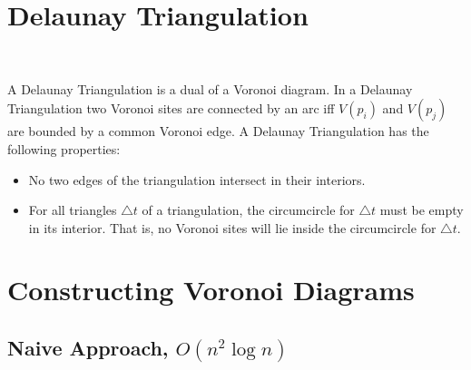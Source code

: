 \documentclass[12pt]{article}
\begin{document}
\section{Delaunay Triangulation}

    \begin{center}
     \\
    \end{center}

    A Delaunay Triangulation is a dual of a Voronoi diagram.  In a
    Delaunay Triangulation two Voronoi sites are connected by an arc
    iff $V(p_i)$ and $V(p_j)$ are bounded by a common Voronoi edge.  A
    Delaunay Triangulation has the following properties:
        \begin{itemize}
            \item No two edges of the triangulation intersect in their interiors.
            \item For all triangles $\triangle t$ of a triangulation, the
            circumcircle for $\triangle t$ must be empty in its interior.  That
            is, no Voronoi sites will lie inside the circumcircle for $\triangle
            t$. 
        \end{itemize}

\section{Constructing Voronoi Diagrams}

    \subsection{Naive Approach, $O(n^2 \log n)$}
\end{document}
